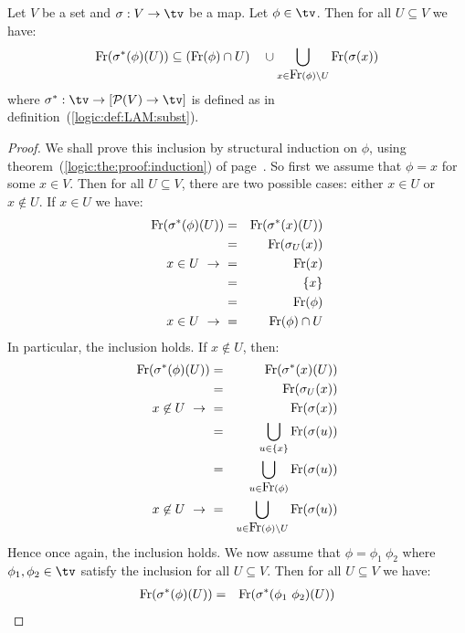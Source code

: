 \begin{prop}\label{logic:prop:LAM:freevar:of:betasubst:gen}
Let $V$ be a set and $\sigma:V\to\tv$ be a map. Let $\phi\in\tv$.
Then for all $U\subseteq V$ we have:
    \[
        \free(\sigma^{*}(\phi)(U)) 
            \subseteq 
        (\free(\phi)\cap U)\ \ \ 
            \cup
        \bigcup_{x\in\free(\phi)\setminus U} \free(\sigma(x))
    \]
where $\sigma^{*}:\tv\to[{\cal P}(V)\to\tv]$ is defined as in 
definition~(\ref{logic:def:LAM:subst}).
\end{prop}
\begin{proof}
We shall prove this inclusion by structural induction on $\phi$, using
theorem~(\ref{logic:the:proof:induction}) of 
page~\pageref{logic:the:proof:induction}. So first we assume that $\phi=x$ 
for some $x\in V$. Then for all $U\subseteq V$, there are two possible cases: 
either $x\in U$ or $x\not\in U$. If $x\in U$ we have:
    \begin{eqnarray*}
        \mbox{\rm Fr}(\sigma^{*}(\phi)(U))
        &=&\mbox{\rm Fr}(\sigma^{*}(x)(U))\\
        &=&\mbox{\rm Fr}(\sigma_{U}(x))\\
        \mbox{$x\in U\ \rightarrow\ $}&=&\mbox{\rm Fr}(x)\\
         &=&\{x\}\\
         &=&\mbox{\rm Fr}(\phi)\\
        \mbox{$x\in U\ \rightarrow\ $}&=&\mbox{\rm Fr}(\phi)\cap U
    \end{eqnarray*}
In particular, the inclusion holds. If $x\not\in U$, then:
     \begin{eqnarray*}
        \free(\sigma^{*}(\phi)(U))
        &=&\free(\sigma^{*}(x)(U))\\
        &=&\free(\sigma_{U}(x))\\
        \mbox{$x\not\in U\ \rightarrow\ $}&=&\free(\sigma(x))\\
        &=&\bigcup_{u\in\{x\}} \free(\sigma(u))\\
        &=&\bigcup_{u\in\free(\phi)} \free(\sigma(u))\\
        \mbox{$x\not\in U\ \rightarrow\ $}&=&\bigcup_{u\in\free(\phi)\setminus U} 
            \free(\sigma(u))
    \end{eqnarray*}
Hence once again, the inclusion holds. We now assume that 
$\phi=\phi_{1}\ \phi_{2}$ where $\phi_{1}, \phi_{2}\in\tv$ satisfy the 
inclusion for all $U\subseteq V$. Then for all $U\subseteq V$ we have:
    \begin{eqnarray*}
        \free(\sigma^{*}(\phi)(U))
        &=&\free(\sigma^{*}(\phi_{1}\ \phi_{2})(U))\\

\end{eqnarray*}
\end{proof}
